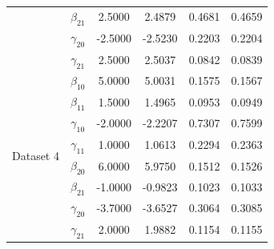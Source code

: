 \begin{table}[!h]
{\begin{tabular}{lccccc}
 & $\beta_{21}$ & 2.5000 & 2.4879 & 0.4681 & 0.4659\\
 & $\gamma_{20}$ & -2.5000 & -2.5230 & 0.2203 & 0.2204\\
 & $\gamma_{21}$ & 2.5000 & 2.5037 & 0.0842 & 0.0839\\
\midrule
\multirow{8}{*}{Dataset 4} & $\beta_{10}$ & 5.0000 & 5.0031 & 0.1575 & 0.1567\\
 & $\beta_{11}$ & 1.5000 & 1.4965 & 0.0953 & 0.0949\\
 & $\gamma_{10}$ & -2.0000 & -2.2207 & 0.7307 & 0.7599\\
 & $\gamma_{11}$ & 1.0000 & 1.0613 & 0.2294 & 0.2363\\
 & $\beta_{20}$ & 6.0000 & 5.9750 & 0.1512 & 0.1526\\
 & $\beta_{21}$ & -1.0000 & -0.9823 & 0.1023 & 0.1033\\
 & $\gamma_{20}$ & -3.7000 & -3.6527 & 0.3064 & 0.3085\\
 & $\gamma_{21}$ & 2.0000 & 1.9882 & 0.1154 & 0.1155\\
\bottomrule
\end{tabular}
}
    \label{tab:sim_more}
\end{table}
